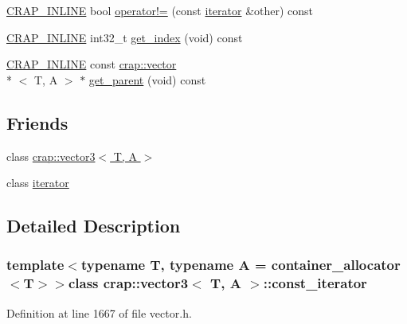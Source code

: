 \begin{DoxyCompactItemize}
\hyperlink{config__x86_8h_a5a40526b8d842e7ff731509998bb0f1c}{C\+R\+A\+P\+\_\+\+I\+N\+L\+I\+N\+E} bool \hyperlink{classcrap_1_1vector3_1_1const__iterator_a6e3ab8966d7d70e8849113001bb3e483}{operator!=} (const \hyperlink{classcrap_1_1vector3_1_1iterator}{iterator} \&other) const 
\item 
\hyperlink{config__x86_8h_a5a40526b8d842e7ff731509998bb0f1c}{C\+R\+A\+P\+\_\+\+I\+N\+L\+I\+N\+E} int32\+\_\+t \hyperlink{classcrap_1_1vector3_1_1const__iterator_a24fd2bd2d28b6ab5d0a970a5727d77ca}{get\+\_\+index} (void) const 
\item 
\hyperlink{config__x86_8h_a5a40526b8d842e7ff731509998bb0f1c}{C\+R\+A\+P\+\_\+\+I\+N\+L\+I\+N\+E} const \hyperlink{classcrap_1_1vector}{crap\+::vector}\\*
$<$ T, A $>$ $\ast$ \hyperlink{classcrap_1_1vector3_1_1const__iterator_a44921eb8d1b370fa7faf7aba3107b112}{get\+\_\+parent} (void) const 
\end{DoxyCompactItemize}
\subsection*{Friends}
\begin{DoxyCompactItemize}
\item 
class \hyperlink{classcrap_1_1vector3_1_1const__iterator_ad48a63b58dfe30a0d7ebfbdaa4a57e2b}{crap\+::vector3$<$ T, A $>$}
\item 
class \hyperlink{classcrap_1_1vector3_1_1const__iterator_a67171474c4da6cc8efe0c7fafefd2b2d}{iterator}
\end{DoxyCompactItemize}


\subsection{Detailed Description}
\subsubsection*{template$<$typename T, typename A = container\+\_\+allocator$<$\+T$>$$>$class crap\+::vector3$<$ T, A $>$\+::const\+\_\+iterator}



Definition at line 1667 of file vector.\+h.



